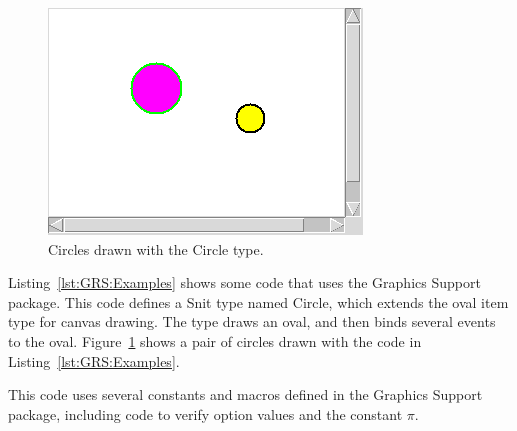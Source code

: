 
\begin{figure}[hbpt]
\begin{centering}
\includegraphics{Circles.png}
\caption{Circles drawn with the Circle type.}
\label{fig:GRS:Circles}
\end{centering}
\end{figure}
Listing~\ref{lst:GRS:Examples} shows some code that uses the Graphics
Support package.  This code defines a Snit type named Circle, which extends
the oval item type for canvas drawing.  The type draws an oval, and
then binds several events to the oval. Figure~\ref{fig:GRS:Circles}
shows a pair of circles drawn with the code in
Listing~\ref{lst:GRS:Examples}.

This code uses several constants and macros defined in the
Graphics Support package, including code to verify option values and the
constant $\pi$.


